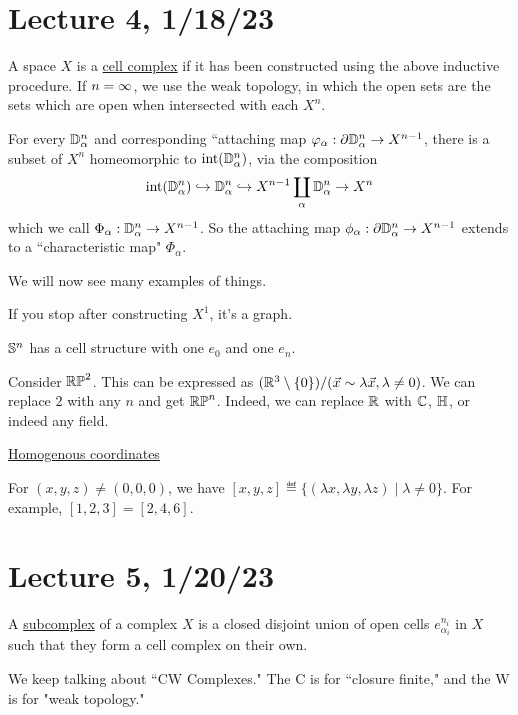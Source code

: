 \documentclass[x11names,reqno,14pt]{extarticle}
\begin{document}
\section*{Lecture 4, 1/18/23}

A space $X$ is a \underline{cell complex} if it has been constructed using the above inductive procedure. If $n = \infty$, we use the weak topology, in which the open sets are the sets which are open when intersected with each $X^n$. 

For every $\mathbb{D}^n_\alpha$ and corresponding ``attaching map $\varphi_\alpha:\partial\mathbb{D}^n_\alpha\to X^{n - 1}$, there is a subset of $X^n$ homeomorphic to $\operatorname{int}(\mathbb{D}^n_\alpha)$, via the composition
\[
\operatorname{int}(\mathbb{D}^n_\alpha) \hookrightarrow \mathbb{D}^n_\alpha \hookrightarrow X^{n - 1}\coprod_{\alpha}\mathbb{D}^n_\alpha \to X^n
\]
which we call $\Phi_\alpha:\mathbb{D}^n_\alpha\to X^{n - 1}$. So the attaching map $\phi_\alpha:\partial\mathbb{D}^n_\alpha\to X^{n - 1}$ extends to a ``characteristic map" $\Phi_\alpha$.

We will now see many examples of things. 

\exm

If you stop after constructing $X^1$, it's a graph. 

\exm

$\mathbb{S}^n$ has a cell structure with one $e_0$ and one $e_n$. 

\exm

Consider ${\mathbb{RP}}^2$. This can be expressed as $(\mathbb{R}^3\setminus\{0\})/(\vec{x}\sim\lambda\vec{x}, \lambda\neq0)$. We can replace $2$ with any $n$ and get ${\mathbb{RP}}^n$. Indeed, we can replace $\mathbb{R}$ with $\mathbb{C}$, $\mathbb{H}$, or indeed any field. 

\underline{Homogenous coordinates}

For $(x, y, z)\neq(0,0,0)$, we have $[x, y, z]\eqdef\{(\lambda x, \lambda y, \lambda z) \mid \lambda \neq0\}$. For example, $[1,2,3]=[2,4,6]$. 

\section*{Lecture 5, 1/20/23}


A \underline{subcomplex} of a complex $X$ is a closed disjoint union of open cells $e^{n_i}_{\alpha_i}$ in $X$ such that they form a cell complex on their own. 

\rem We keep talking about ``CW Complexes." The C is for ``closure finite," and the W is for "weak topology." 
\end{document}
